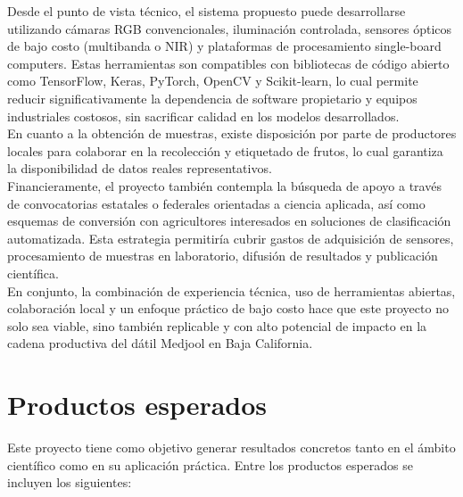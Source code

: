 Desde el punto de vista técnico, el sistema propuesto puede desarrollarse utilizando cámaras RGB convencionales, iluminación controlada, sensores ópticos de bajo costo (multibanda o NIR) y plataformas de procesamiento single-board computers. Estas herramientas son compatibles con bibliotecas de código abierto como TensorFlow, Keras, PyTorch, OpenCV y Scikit-learn, lo cual permite reducir significativamente la dependencia de software propietario y equipos industriales costosos, sin sacrificar calidad en los modelos desarrollados.\\

En cuanto a la obtención de muestras, existe disposición por parte de productores locales para colaborar en la recolección y etiquetado de frutos, lo cual garantiza la disponibilidad de datos reales representativos.\\

Financieramente, el proyecto también contempla la búsqueda de apoyo a través de convocatorias estatales o federales orientadas a ciencia aplicada, así como esquemas de conversión con agricultores interesados en soluciones de clasificación automatizada. Esta estrategia permitiría cubrir gastos de adquisición de sensores, procesamiento de muestras en laboratorio, difusión de resultados y publicación científica.\\

En conjunto, la combinación de experiencia técnica, uso de herramientas abiertas, colaboración local y un enfoque práctico de bajo costo hace que este proyecto no solo sea viable, sino también replicable y con alto potencial de impacto en la cadena productiva del dátil Medjool en Baja California.

\section{Productos esperados}

Este proyecto tiene como objetivo generar resultados concretos tanto en el ámbito científico como en su aplicación práctica. Entre los productos esperados se incluyen los siguientes:

